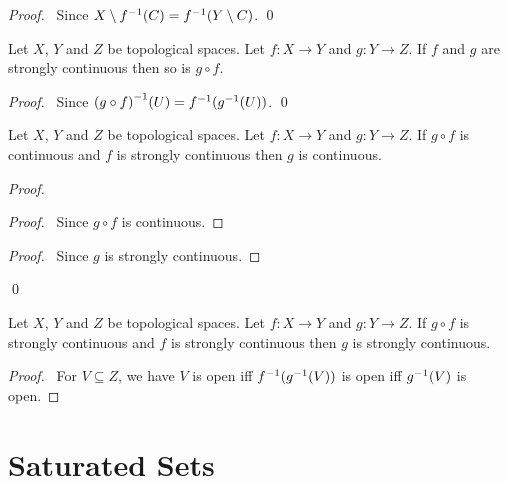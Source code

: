 \begin{proof}
    \pf\ Since $X \setminus {f}^{-1}(C) = {f}^{-1}(Y \setminus C)$. \qed
\end{proof}

\begin{proposition}
    \label{proposition:strongly_continuous_composite}
    Let $X$, $Y$ and $Z$ be topological spaces. Let $f : X \rightarrow Y$ and $g : Y \rightarrow Z$. If $f$ and $g$ are strongly continuous then so is $g \circ f$.
\end{proposition}

\begin{proof}
    \pf\ Since ${(g \circ f)}^{-1}(U) = {f}^{-1}({g}^{-1}(U))$. \qed
\end{proof}

\begin{proposition}
    \label{proposition:continuous_strongly_continuous}
    Let $X$, $Y$ and $Z$ be topological spaces.
    Let $f : X \rightarrow Y$ and $g : Y \rightarrow Z$.
    If $g \circ f$ is continuous and $f$ is strongly continuous then 
    $g$ is continuous.
\end{proposition}

\begin{proof}
    \pf
    \begin{proof}
        \pf\ Since $g \circ f$ is continuous.
    \end{proof}
    \begin{proof}
        \pf\ Since $g$ is strongly continuous.
    \end{proof}
    \qed
\end{proof}

\begin{proposition}
    \label{proposition:strongly_continuous_strongly_continuous}
    Let $X$, $Y$ and $Z$ be topological spaces.
    Let $f : X \rightarrow Y$ and $g : Y \rightarrow Z$.
    If $g \circ f$ is strongly continuous and $f$ is strongly continuous then 
    $g$ is strongly continuous.
\end{proposition}

\begin{proof}
    \pf\ For $V \subseteq Z$, we have $V$ is open iff ${f}^{-1}({g}^{-1}(V))$ is
    open iff ${g}^{-1}(V)$ is open.
\end{proof}

\section{Saturated Sets}

